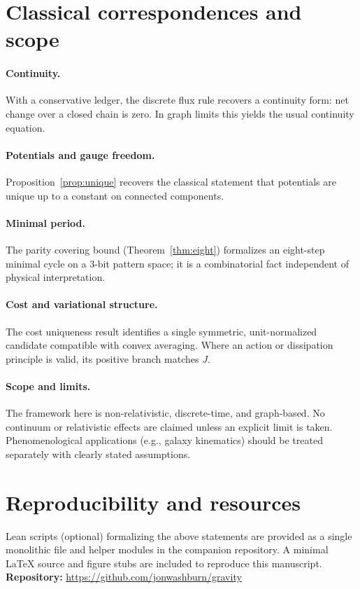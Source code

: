\documentclass[11pt,letterpaper]{article}
\begin{document}
\section{Classical correspondences and scope}
\paragraph{Continuity.} With a conservative ledger, the discrete flux rule recovers a continuity form: net change over a closed chain is zero. In graph limits this yields the usual continuity equation.

\paragraph{Potentials and gauge freedom.} Proposition~\ref{prop:unique} recovers the classical statement that potentials are unique up to a constant on connected components.

\paragraph{Minimal period.} The parity covering bound (Theorem~\ref{thm:eight}) formalizes an eight-step minimal cycle on a 3-bit pattern space; it is a combinatorial fact independent of physical interpretation.

\paragraph{Cost and variational structure.} The cost uniqueness result identifies a single symmetric, unit-normalized candidate compatible with convex averaging. Where an action or dissipation principle is valid, its positive branch matches $J$.

\paragraph{Scope and limits.} The framework here is non-relativistic, discrete-time, and graph-based. No continuum or relativistic effects are claimed unless an explicit limit is taken. Phenomenological applications (e.g., galaxy kinematics) should be treated separately with clearly stated assumptions.

\section{Reproducibility and resources}
Lean scripts (optional) formalizing the above statements are provided as a single monolithic file and helper modules in the companion repository. A minimal LaTeX source and figure stubs are included to reproduce this manuscript.\newline
\textbf{Repository:} \url{https://github.com/jonwashburn/gravity}
\end{document}
